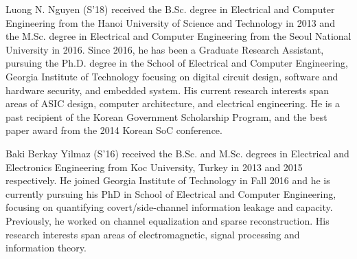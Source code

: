 \documentclass[journal]{IEEEtran}
\begin{document}
\begin{IEEEbiography}
	{Luong N. Nguyen} (S'18) received
	the B.Sc. degree in Electrical and Computer Engineering from the Hanoi University of Science and Technology in 2013 and
	the M.Sc. degree in Electrical and Computer Engineering from the Seoul National University in 2016.
	Since 2016, he has been a Graduate Research Assistant, pursuing the Ph.D. degree in the School of Electrical and Computer Engineering,
	Georgia Institute of Technology focusing on digital circuit design, software and hardware security, and embedded system.
	His current research interests span areas of ASIC design, computer architecture, and electrical engineering.
	He is a past recipient of the Korean Government Scholarship Program, and the best paper award from the 2014 Korean SoC conference.
\end{IEEEbiography}

\begin{IEEEbiography}[]
	{Baki Berkay Yilmaz} (S’16) received the B.Sc. and 	M.Sc. degrees in Electrical and Electronics Engineering from Koc University, Turkey in 2013 and 2015 respectively. He joined Georgia Institute of Technology in Fall 2016 and he is currently pursuing his PhD in School of Electrical and Computer Engineering, focusing on quantifying covert/side-channel information leakage and capacity. Previously, he worked on channel equalization and sparse reconstruction. His research interests span areas of electromagnetic, signal processing and information
	theory.
\end{IEEEbiography}
\end{document}
